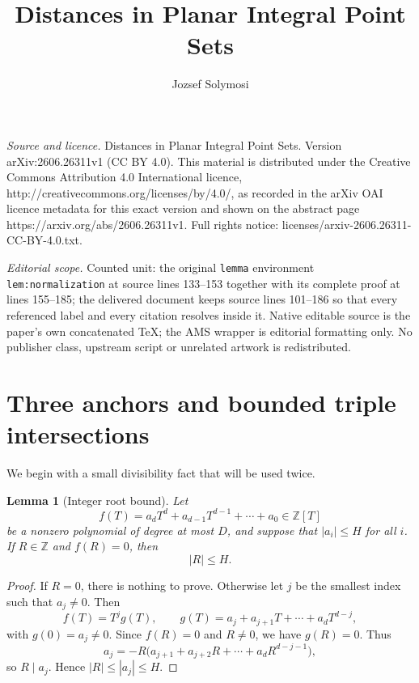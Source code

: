 \documentclass[10pt,a4paper]{amsart}
\newtheorem{lemma}[theorem]{Lemma}
\newcommand{\ZZ}{\mathbb Z}
\begin{document}
\title[Distances in Planar Integral Point Sets]{Distances in Planar Integral Point Sets}
\author{Jozsef Solymosi}
\date{}
\maketitle
\noindent\emph{Source and licence.} Distances in Planar Integral Point Sets. Version arXiv:2606.26311v1 (CC BY 4.0). This material is distributed under the Creative Commons Attribution 4.0 International licence, http://creativecommons.org/licenses/by/4.0/, as recorded in the arXiv OAI licence metadata for this exact version and shown on the abstract page https://arxiv.org/abs/2606.26311v1. Full rights notice: licenses/arxiv-2606.26311-CC-BY-4.0.txt.\par\smallskip
\noindent\textit{Editorial scope.} Counted unit: the original \texttt{lemma} environment \texttt{lem:normalization} at source lines 133--153 together with its complete proof at lines 155--185; the delivered document keeps source lines 101--186 so that every referenced label and every citation resolves inside it. Native editable source is the paper's own concatenated TeX; the AMS wrapper is editorial formatting only. No publisher class, upstream script or unrelated artwork is redistributed.
\section{Three anchors and bounded triple intersections}

We begin with a small divisibility fact that will be used twice.

\begin{lemma}[Integer root bound]\label{lem:root}
Let
\[
        f(T)=a_dT^d+a_{d-1}T^{d-1}+\cdots+a_0\in\ZZ[T]
\]
be a nonzero polynomial of degree at most \(D\), and suppose that
\(|a_i|\le H\) for all \(i\).  If \(R\in\ZZ\) and \(f(R)=0\), then
\[
        |R|\le H.
\]
\end{lemma}

\begin{proof}
If \(R=0\), there is nothing to prove.  Otherwise let \(j\) be the smallest
index such that \(a_j\ne0\).  Then
\[
        f(T)=T^jg(T),
        \qquad
        g(T)=a_j+a_{j+1}T+\cdots+a_dT^{d-j},
\]
with \(g(0)=a_j\ne0\).  Since \(f(R)=0\) and \(R\ne0\), we have \(g(R)=0\).
Thus
\[
        a_j=-R\bigl(a_{j+1}+a_{j+2}R+\cdots+a_dR^{d-j-1}\bigr),
\]
so \(R\mid a_j\).  Hence \(|R|\le |a_j|\le H\).
\end{proof}
\end{document}
